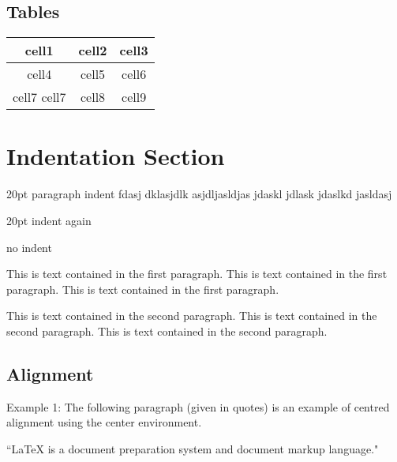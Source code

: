 \documentclass[12pt, letterpaper]{article}
\begin{document}
\subsection{Tables}


\begin{center}
\begin{tabular}{|| c | c | c ||}
  \hline
  cell1& cell2 & cell3 \\ 
  \hline
  cell4 & cell5 & cell6 \\ 
  \hline
  cell7 \newline cell7  & cell8 & cell9 \\ 
  \hline
\end{tabular}
\end{center}


\section*{Indentation Section}

\setlength{\parindent}{20pt}

20pt paragraph indent fdasj dklasjdlk asjdljasldjas jdaskl jdlask jdaslkd jasldasj

20pt indent again

\setlength{\parindent}{0pt}

no indent



This is text contained in the first paragraph. 
This is text contained in the first paragraph. 
This is text contained in the first paragraph.\par
This is text contained in the second paragraph. 
This is text contained in the second paragraph.
This is text contained in the second paragraph.


\subsection*{Alignment}

\begin{center}
Example 1: The following paragraph (given in quotes) is an 
example of centred alignment using the center environment. 

``La\TeX{} is a document preparation system and document markup 
language."
\end{center}
\end{document}
